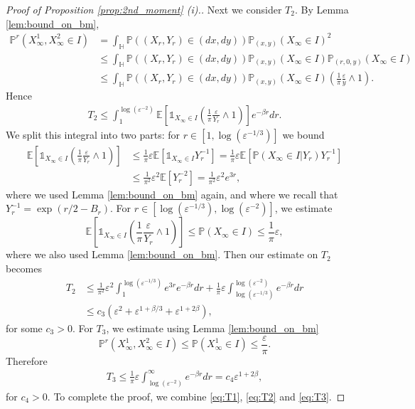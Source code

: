 \documentclass{article}
\theoremstyle{definition}
\numberwithin{equation}{section}
\numberwithin{thm}{section}
\newcommand*{\eps}{\ensuremath{\varepsilon}}            %
\newcommand*{\EE}{\ensuremath{\mathbb{E}}}	        	%
\newcommand*{\PP}{\ensuremath{\mathbb{P}}}	        	%
\newcommand*{\HH}{\ensuremath{\mathbb{H}}}	        	%
\newcommand*{\II}{\ensuremath{\mathds{1}}}	        	%
\begin{document}
\begin{proof}[Proof of Proposition \ref{prop:2nd_moment} (i).]
Next we consider $T_2$. By Lemma \ref{lem:bound_on_bm},
\begin{align*}
    \PP^r\left(X^1_\infty,X_\infty^2\in I\right) &=\int_\HH \PP((X_r,Y_r)\in(dx,dy))\PP_{(x,y)}(X_\infty \in I)^2 \\
    &\leq \int_\HH \PP((X_r,Y_r)\in(dx,dy))\PP_{(x,y)}(X_\infty \in I)\PP_{(r,0,y)}(X_\infty \in I)\\
    &\leq \int_\HH \PP((X_r,Y_r)\in(dx,dy))\PP_{(x,y)}(X_\infty \in I)\left(\frac{1}{\pi}\frac{\eps}{y} \wedge 1\right).
\end{align*}
{Hence}
\begin{align*}
    T_2 \leq \int_1^{\log(\eps^{-2})}\EE\left[\II_{X_\infty \in I} \left(\frac{1}{\pi}\frac{\eps}{Y_r} \wedge 1\right)\right] e^{-\beta r}dr.
\end{align*}
We split this integral into two parts: for $r\in [1,\log(\eps^{-1/3})]$ we bound
\begin{align*}
    \EE\left[ \II_{X_\infty\in I}\left(\frac{1}{\pi}\frac{\eps}{Y_r} \wedge 1\right)\right] &\leq \frac{1}{\pi}\eps\EE\left[\II_{X_\infty\in I}  Y_r^{-1}\right] = \frac{1}{\pi}\eps \EE\left[\PP(X_\infty\in I \vert Y_r) 
    Y_r^{-1}\right]\\
    &\leq \frac{1}{\pi^2}\eps^2 \EE\left[
    Y_r^{-2}\right] = \frac{1}{\pi^2}\eps^2 e^{3r},
\end{align*}
where we used Lemma \ref{lem:bound_on_bm} again, and where we recall that $Y_r^{-1} = \exp(r/2-B_r)$.
{F}or $r\in  [\log(\eps^{-1/3}),\log(\eps^{-2})]$, {we estimate}
\begin{equation*}
    \EE\left[ \II_{X_\infty\in I}\left(\frac{1}{\pi}\frac{\eps}{Y_r} \wedge 1\right)\right] \leq \PP(X_\infty \in I) \leq \frac{1}{\pi}\eps,
\end{equation*}
where we also used Lemma \ref{lem:bound_on_bm}.
Then our estimate on $T_2$ becomes
\begin{align}
    T_2 &\leq \frac{1}{\pi^2}\eps^2\int_1^{\log(\eps^{-1/3})} e^{3r}e^{-\beta r}dr + \frac{1}{\pi}\eps\int_{\log(\eps^{-1/3})}^{\log(\eps^{-2})}e^{-\beta r}dr \nonumber\\
    &\leq c_3\left(\eps^2 + \eps^{1+\beta/3} + \eps^{1+2\beta}\right), \label{eq:T2}
\end{align}
for some $c_3>0$.
For $T_3$, we estimate using Lemma \ref{lem:bound_on_bm}
\begin{equation*}
    \PP^r(X_\infty^1, X_\infty^2 \in I)\leq \PP(X_\infty^1\in I) \leq \frac{\eps}{\pi}.
\end{equation*}
Therefore
\begin{align}\label{eq:T3}
    T_3\leq \frac{1}{\pi}\eps \int_{\log(\eps^{-2})}^\infty e^{-\beta r}dr = c_4 \eps^{1+2\beta},
\end{align}
for $c_4>0$. 
To complete the proof, we combine \eqref{eq:T1}, \eqref{eq:T2} and \eqref{eq:T3}.


\end{proof}
\end{document}
